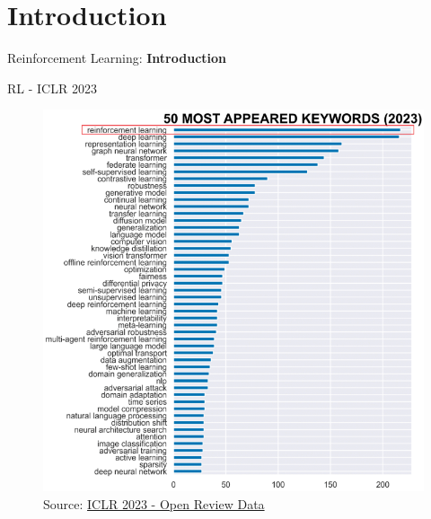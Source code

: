\section{Introduction}
\begin{frame}{}
    \LARGE Reinforcement Learning: \textbf{Introduction}
\end{frame}

\begin{frame}[allowframebreaks]{RL - ICLR 2023}
    \begin{figure}
        \centering
        \includegraphics[height=0.8\textheight,width=\textwidth,keepaspectratio]{images/intro/most-popular.png}
        \caption*{Source: \href{https://github.com/EdisonLeeeee/ICLR2023-OpenReviewData}{ICLR 2023 - Open Review Data}}
    \end{figure}
\end{frame}

